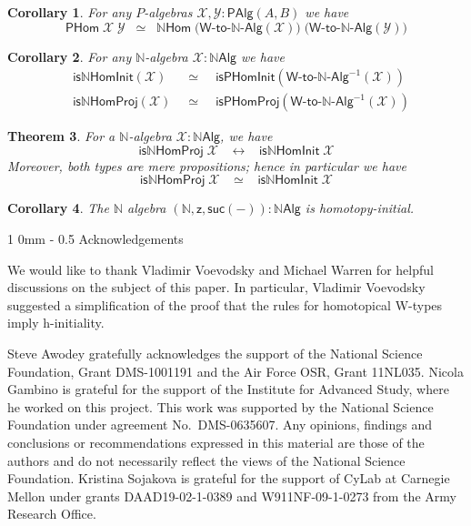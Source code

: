 \documentclass[reqno,10pt,a4paper,oneside]{amsart}
\makeatletter
\numberwithin{equation}{section}
\renewcommand{\section}{\@startsection
  {section}%
   {1}%
  {0mm}%
   {-\baselineskip}%
  {0.5\baselineskip}%
   {\Large\bfseries}}%
\theoremstyle{mythm}
\newtheorem{theorem}{Theorem}[section]
\newtheorem{corollary}[theorem]{Corollary}
\theoremstyle{mydef}
\theoremstyle{myrmk}
\newcommand{\nat}{\ensuremath{\mathbb{N}}}
\newcommand{\suc}{\mathsf{suc}}
\newcommand{\W}{\mathsf{W}}
\newcommand{\NatAlg}{\nat\mathsf{Alg}}
\newcommand{\NatHom}{\nat\mathsf{Hom}}
\newcommand{\IsNatHInit}{\mathsf{is}\nat\mathsf{HomInit}}
\newcommand{\IsNatHProj}{\mathsf{is}\nat\mathsf{HomProj}}
\newcommand{\WAlgToNatAlg}{\W\text{-}\mathsf{to}\text{-}\nat\text{-}\mathsf{Alg}}
\newcommand{\WAlg}{\mathsf{PAlg}}
\newcommand{\WHom}{\mathsf{PHom}}
\newcommand{\IsWHInit}{\mathsf{isPHomInit}}
\newcommand{\IsWHProj}{\mathsf{isPHomProj}}
\newcommand{\X}{\mathcal{X}}
\newcommand{\Y}{\mathcal{Y}}
\newcommand{\z}{\mathsf{z}}
\makeatother
\begin{document}
\begin{corollary}
For any $P$-algebras $\X,\Y : \WAlg(A,B)$ we have
\[ \WHom \; \X \; \Y \;\; \simeq \;\; \NatHom \; \big(\WAlgToNatAlg(\X)\big) \; \big(\WAlgToNatAlg(\Y)\big) \]
\end{corollary}

\begin{corollary}
For any $\nat$-algebra $\X : \NatAlg$ we have
\begin{alignat*}{4}
& \IsNatHInit(\X) \;\; & \simeq \;\; & \IsWHInit(\WAlgToNatAlg^{-1}(\X)) \\
& \IsNatHProj(\X) \;\; & \simeq \;\; & \IsWHProj(\WAlgToNatAlg^{-1}(\X))
\end{alignat*}
\end{corollary}

\begin{theorem}\label{lem:WMainInternal}
For a $\nat$-algebra $\X : \NatAlg$, we have
\[ \IsNatHProj \; \X \;\;\; \leftrightarrow \;\;\; \IsNatHInit \; \X \]
Moreover, both types are mere propositions; hence in particular we have
\[ \IsNatHProj \; \X \;\;\; \simeq \;\;\; \IsNatHInit \; \X \]
\end{theorem}

\begin{corollary}\label{lem:NatInitInt}
The $\nat$ algebra $(\nat,\z,\suc(-)) : \NatAlg$ is homotopy-initial.
\end{corollary}

\section{Acknowledgements}

We would like to thank Vladimir Voevodsky and Michael Warren for helpful discussions
on the subject of this paper. In particular, Vladimir Voevodsky suggested a simplification of the 
proof that the rules for homotopical W-types imply h-initiality.

Steve Awodey gratefully acknowledges the support of the National Science Foundation, Grant DMS-1001191
 and the Air Force OSR, Grant 11NL035.
Nicola Gambino is grateful for the support of the Institute for Advanced Study, where
he worked on this project. This work was supported by the National Science Foundation 
under agreement No.\ DMS-0635607. Any opinions, findings and conclusions or recommendations
expressed in this material are those of the authors and do not necessarily reflect the views of
the National Science Foundation.
Kristina Sojakova is grateful for the support of CyLab at Carnegie
Mellon under grants DAAD19-02-1-0389 and W911NF-09-1-0273 from the Army
Research Office.






                        
\end{document}
